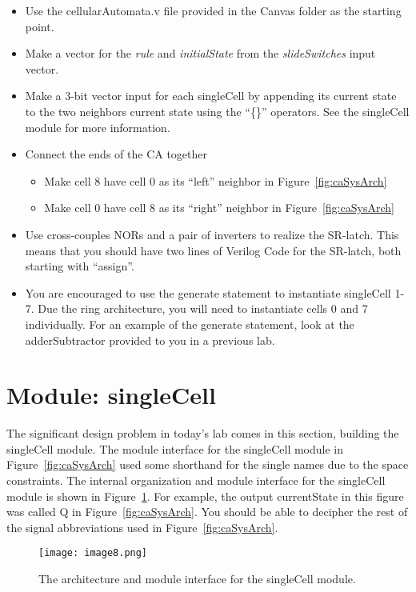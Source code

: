 \begin{itemize}
\item
  Use the cellularAutomata.v file provided in the Canvas folder as the
  starting point.
\item
  Make a vector for the \emph{rule} and \emph{initialState} from the
  \emph{slideSwitches} input vector.
\item
  Make a 3-bit vector input for each singleCell by appending its current
  state to the two neighbors current state using the ``\{\}'' operators.
  See the singleCell module for more information.
\item
  Connect the ends of the CA together

  \begin{itemize}
  \item
    Make cell 8 have cell 0 as its ``left'' neighbor in Figure~\ref{fig:caSysArch}
  \item
    Make cell 0 have cell 8 as its ``right'' neighbor in Figure~\ref{fig:caSysArch}
  \end{itemize}
\item
  Use cross-couples NORs and a pair of inverters to realize the SR-latch. This means that you
  should have two lines of Verilog Code for the SR-latch, both starting
  with ``assign''.
\item
  You are encouraged to use the generate statement to instantiate
  singleCell 1-7. Due the ring architecture, you will need to
  instantiate cells 0 and 7 individually. For an example of the generate
  statement, look at the adderSubtractor provided to you in a previous
  lab.
\end{itemize}


\section{Module: singleCell}

The significant design problem in today's lab comes in this section,
building the singleCell module. The module interface for the singleCell
module in Figure~\ref{fig:caSysArch} used some shorthand for the single names due to the
space constraints. The internal organization and module interface for
the singleCell module is shown in Figure~\ref{fig:caSingleCell}. For example, the output
currentState in this figure was called Q in Figure~\ref{fig:caSysArch}. You should be able
to decipher the rest of the signal abbreviations used in Figure~\ref{fig:caSysArch}.

\begin{figure}[ht]
\texttt{[image: image8.png]}
\caption{The architecture and module interface for the singleCell module.}
\label{fig:caSingleCell}
\end{figure}

